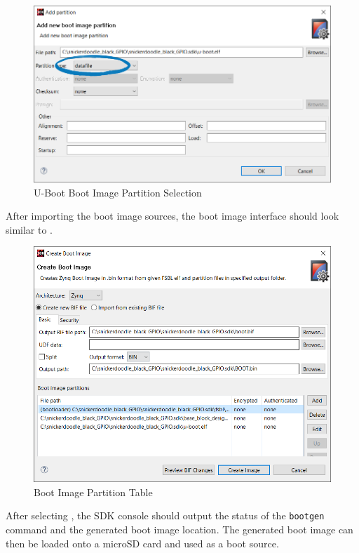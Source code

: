 \begin{figure}
	\centering
	\includegraphics{images/sdk/u_boot_bootgen_partition.png}
	\caption[U-Boot Boot Image Partition Selection]{U-Boot Boot Image Partition Selection}
	\label{fig:ubootbootimagepart}
\end{figure}


After importing the boot image sources, the boot image interface should look similar to . \\


\begin{figure}
	\centering
	\includegraphics{images/sdk/create_boot_image_layout.png}
	\caption{Boot Image Partition Table}
	\label{fig:bootimageparttable}
\end{figure}


After selecting , the SDK console should output the status of the \texttt{bootgen} command and the generated boot image location. The generated boot image can then be loaded onto a microSD card and used as a boot source.


